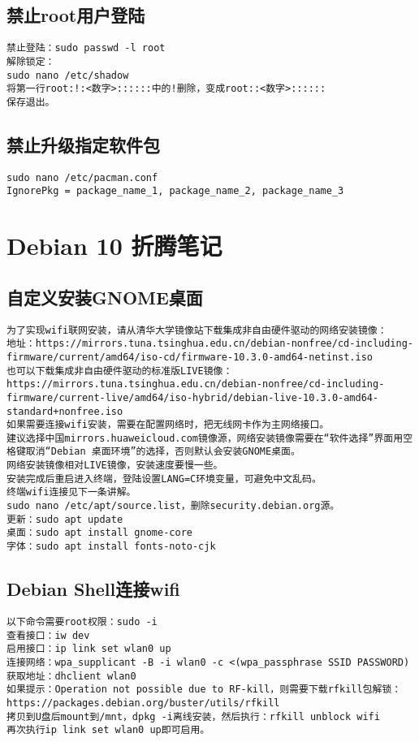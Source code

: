 \documentclass[a4paper,fontset=fandol,zihao=-4,linespread=1.2]{ctexbook}
\begin{document}
\section{禁止root用户登陆}
\begin{lstlisting}
禁止登陆：sudo passwd -l root
解除锁定：
sudo nano /etc/shadow
将第一行root:!:<数字>::::::中的!删除，变成root::<数字>::::::
保存退出。
\end{lstlisting}

\section{禁止升级指定软件包}
\begin{lstlisting}
sudo nano /etc/pacman.conf
IgnorePkg = package_name_1, package_name_2, package_name_3
\end{lstlisting}


\chapter{Debian 10 折腾笔记}

\section{自定义安装GNOME桌面}
\begin{lstlisting}
为了实现wifi联网安装，请从清华大学镜像站下载集成非自由硬件驱动的网络安装镜像：
地址：https://mirrors.tuna.tsinghua.edu.cn/debian-nonfree/cd-including-firmware/current/amd64/iso-cd/firmware-10.3.0-amd64-netinst.iso
也可以下载集成非自由硬件驱动的标准版LIVE镜像：
https://mirrors.tuna.tsinghua.edu.cn/debian-nonfree/cd-including-firmware/current-live/amd64/iso-hybrid/debian-live-10.3.0-amd64-standard+nonfree.iso
如果需要连接wifi安装，需要在配置网络时，把无线网卡作为主网络接口。
建议选择中国mirrors.huaweicloud.com镜像源，网络安装镜像需要在“软件选择”界面用空格键取消“Debian 桌面环境”的选择，否则默认会安装GNOME桌面。
网络安装镜像相对LIVE镜像，安装速度要慢一些。
安装完成后重启进入终端，登陆设置LANG=C环境变量，可避免中文乱码。
终端wifi连接见下一条讲解。
sudo nano /etc/apt/source.list，删除security.debian.org源。
更新：sudo apt update
桌面：sudo apt install gnome-core
字体：sudo apt install fonts-noto-cjk
\end{lstlisting}

\section{Debian Shell连接wifi}
\begin{lstlisting}
以下命令需要root权限：sudo -i
查看接口：iw dev
启用接口：ip link set wlan0 up
连接网络：wpa_supplicant -B -i wlan0 -c <(wpa_passphrase SSID PASSWORD)
获取地址：dhclient wlan0
如果提示：Operation not possible due to RF-kill，则需要下载rfkill包解锁：https://packages.debian.org/buster/utils/rfkill
拷贝到U盘后mount到/mnt，dpkg -i离线安装，然后执行：rfkill unblock wifi
再次执行ip link set wlan0 up即可启用。
\end{lstlisting}
\end{document}
